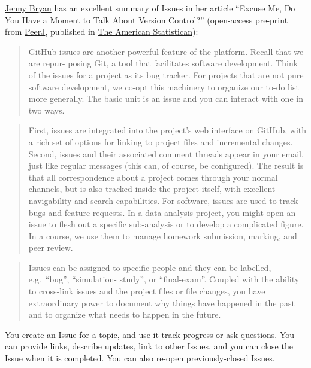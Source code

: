 \documentclass[
  letterpaper,
  DIV=11,
  numbers=noendperiod]{scrreprt}
\begin{document}
\href{https://twitter.com/jennybryan/}{Jenny Bryan} has an excellent
summary of Issues in her article ``Excuse Me, Do You Have a Moment to
Talk About Version Control?'' (open-access pre-print from
\href{https://peerj.com/preprints/3159/}{PeerJ}, published in
\href{https://www.tandfonline.com/doi/full/10.1080/00031305.2017.1399928}{The
American Statistican}):

\begin{quote}
GitHub issues are another powerful feature of the platform. Recall that
we are repur- posing Git, a tool that facilitates software development.
Think of the issues for a project as its bug tracker. For projects that
are not pure software development, we co-opt this machinery to organize
our to-do list more generally. The basic unit is an issue and you can
interact with one in two ways.
\end{quote}

\begin{quote}
First, issues are integrated into the project's web interface on GitHub,
with a rich set of options for linking to project files and incremental
changes. Second, issues and their associated comment threads appear in
your email, just like regular messages (this can, of course, be
configured). The result is that all correspondence about a project comes
through your normal channels, but is also tracked inside the project
itself, with excellent navigability and search capabilities. For
software, issues are used to track bugs and feature requests. In a data
analysis project, you might open an issue to flesh out a specific
sub-analysis or to develop a complicated figure. In a course, we use
them to manage homework submission, marking, and peer review.
\end{quote}

\begin{quote}
Issues can be assigned to specific people and they can be labelled,
e.g.~``bug'', ``simulation- study'', or ``final-exam''. Coupled with the
ability to cross-link issues and the project files or file changes, you
have extraordinary power to document why things have happened in the
past and to organize what needs to happen in the future.
\end{quote}

You create an Issue for a topic, and use it track progress or ask
questions. You can provide links, describe updates, link to other
Issues, and you can close the Issue when it is completed. You can also
re-open previously-closed Issues.
\end{document}
